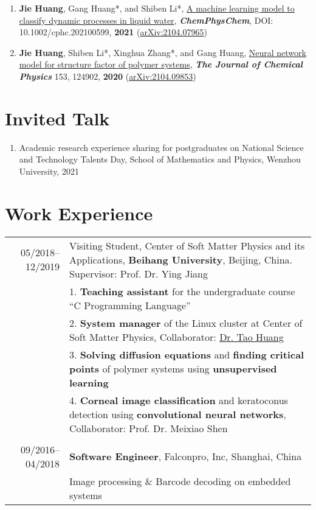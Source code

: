 \documentclass[a4paper,10pt]{article} %
\begin{document}
\begin{small}
\begin{enumerate}
\item \textbf{Jie Huang}, Gang Huang*, and Shiben Li*, \href{https://chemistry-europe.onlinelibrary.wiley.com/doi/abs/10.1002/cphc.202100599}{A machine learning model to classify dynamic processes in liquid water},   \textbf{\emph{ChemPhysChem}}, DOI: 10.1002/cphc.202100599,  \textbf{2021} (\href{https://arxiv.org/abs/2104.07965}{arXiv:2104.07965})

\item \textbf{Jie Huang}, Shiben Li*, Xinghua Zhang*, and Gang Huang, \href{https://aip.scitation.org/doi/10.1063/5.0022464}{Neural network model for structure factor of polymer systems},  \textbf{\emph{The Journal of Chemical Physics}} 153, 124902, \textbf{2020} (\href{https://arxiv.org/abs/2104.09853}{arXiv:2104.09853})
\end{enumerate}
\end{small}

\section{Invited Talk}  
\begin{small}
	\begin{enumerate}
		\item Academic research experience sharing for postgraduates on National Science and Technology Talents Day, School of Mathematics and Physics, Wenzhou University, 2021
	\end{enumerate}
\end{small}

\section{Work Experience}
\begin{tabular}{r|p{11cm}}
	05/2018--12/2019            & Visiting Student,  Center of Soft Matter Physics and its Applications, \textbf{Beihang University}, Beijing, China. Supervisor: Prof. Dr. Ying Jiang  \\
	& 1. \textbf{Teaching assistant} for the undergraduate course “C Programming Language” \\
	& 2. \textbf{System manager} of the Linux cluster at Center of Soft Matter Physics, Collaborator: \href{http://taohonker.science/}{Dr. Tao Huang}\\
	& 3. \textbf{Solving diffusion equations} and \textbf{finding critical points} of polymer systems using \textbf{unsupervised learning}\\
	& 4. \textbf{Corneal image classification} and keratoconus detection using \textbf{convolutional neural networks}, Collaborator: Prof. Dr. Meixiao Shen\\
	\multicolumn{2}{c}{} \\	%
	09/2016--04/2018            & \textbf{Software Engineer}, Falconpro, Inc, Shanghai, China \\                          & \footnotesize{Image processing \& Barcode} decoding on embedded systems
\end{tabular}
\end{document}
